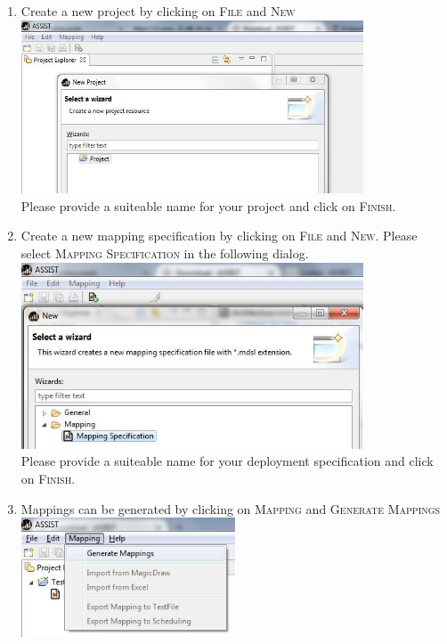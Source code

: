 \begin{enumerate}
\item Create a new project by clicking on \textsc{File} and \textsc{New}\\
\includegraphics[width=0.8\textwidth]{gfx/install-new-project.jpg}\\
Please provide a suiteable name for your project and click on \textsc{Finish}.

\item Create a new mapping specification by clicking on \textsc{File} and \textsc{New}. Please select \textsc{Mapping Specification} in the following dialog.\\
\includegraphics[width=0.8\textwidth]{gfx/install-new-mdsl-file.jpg}\\
Please provide a suiteable name for your deployment specification and click on \textsc{Finish}.

\item Mappings can be generated by clicking on \textsc{Mapping} and \textsc{Generate Mappings}\\
\includegraphics[width=0.5\textwidth]{gfx/install-generate-mappings.jpg}
\end{enumerate}

